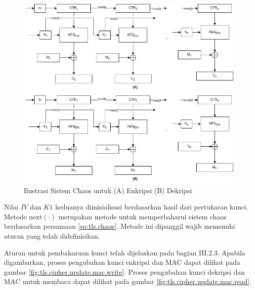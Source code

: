 \begin{figure}[!h]
  \centering
  \includegraphics[width=\textwidth]{chapters/res/chapter-3/img/cipher.png}
  \caption{Ilustrasi Sistem Chaos untuk (A) Enkripsi (B) Dekripsi} \label{fig:tls.cipher}
\end{figure}

Nilai $IV$ dan $K1$ keduanya diinisialisasi berdasarkan hasil dari pertukaran kunci. Metode $\text{next}(\cdot)$ merupakan metode untuk memperbaharui sistem chaos berdasarkan persamaan \ref{eq:tls.chaos}. Metode ini dipanggil wajib memenuhi aturan yang telah didefinisikan.

Aturan untuk pembaharuan kunci telah dijelaskan pada bagian III.2.3. Apabila digambarkan, proses pengubahan kunci enkripsi dan MAC dapat dilihat pada gambar \ref{fig:tls.cipher.update.mac.write}. Proses pengubahan kunci dekripsi dan MAC untuk membaca dapat dilihat pada gambar \ref{fig:tls.cipher.update.mac.read}.

